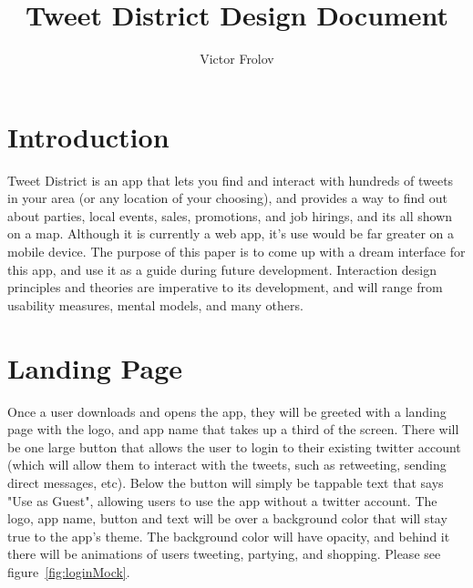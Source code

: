 \documentclass[11pt]{article}
\title{Tweet District Design Document}
\author{Victor Frolov}
\begin{document}
\maketitle

\section{Introduction}
Tweet District is an app that lets you find and interact with hundreds of tweets in your area (or any location of your choosing), and provides a way to find out about parties, local events, sales, promotions, and job hirings, and its all shown on a map. Although it is currently a web app, it's use would be far greater on a mobile device. The purpose of this paper is to come up with a dream interface for this app, and use it as a guide during future development. Interaction design principles and theories are imperative to its development, and will range from usability measures, mental models, and many others.


\section{Landing Page}
Once a user downloads and opens the app, they will be greeted with a landing page with the logo, and app name that takes up a third of the screen. There will be one large button that allows the user to login to their existing twitter account (which will allow them to interact with the tweets, such as retweeting, sending direct messages, etc). Below the button will simply be tappable text that says "Use as Guest", allowing users to use the app without a twitter account. The logo, app name, button and text will be over a background color that will stay true to the app's theme. The background color will have opacity, and behind it there will be animations of users tweeting, partying, and shopping. Please see figure~\ref{fig:loginMock}.
\end{document}
